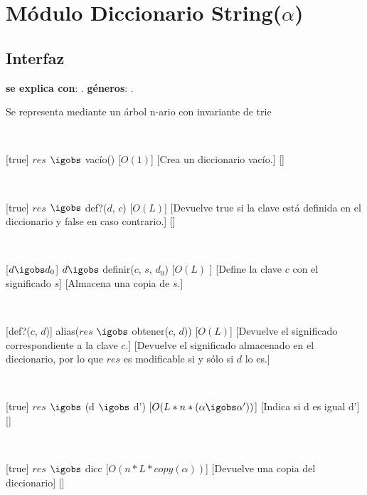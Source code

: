 \section{Módulo Diccionario String($\alpha$)}

\subsection{Interfaz}

\textbf{se explica con}: .
\textbf{géneros}: .

Se representa mediante un árbol n-ario con invariante de trie

~

%
[true]
{$res$ $\igobs$ vacío()}
[$O(1)$]
[Crea un diccionario vacío.]
[]

~

[true]
{$res$ $\igobs$ def?($d$, $c$)}
[$O(L)$]
[Devuelve true si la clave está definida en el diccionario y false en caso contrario.]
[]

~

[$ d \igobs d_0 $]
{$ d \igobs$ definir($c$, $s$, $d_0$)}
[$O(L)$ ]
[Define la clave $c$ con el significado $s$]
[Almacena una copia de $s$.]

~

[def?($c$, $d$)]
{alias($res$ $\igobs$ obtener($c$, $d$))}
[$O(L)$]
[Devuelve el significado correspondiente a la clave $c$.]
[Devuelve el significado almacenado en el diccionario, por lo que $res$ es modificable si y sólo si $d$ lo es.]

~

[true]
{$res$ $\igobs$ (d $\igobs$ d')}
[$O(L*n*(\alpha  \igobs \alpha'))$]
[Indica si d es igual d']
[]

~

[true]
{$res$ $\igobs$ dicc}
[$O(n * L * copy(\alpha))$]
[Devuelve una copia del diccionario]
[]


